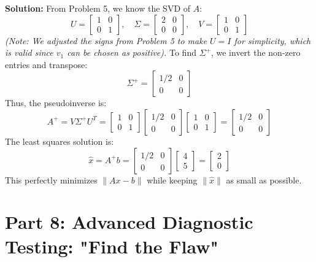 \documentclass[11pt, letterpaper]{article}
\theoremstyle{definition}
\theoremstyle{remark}
\begin{document}
\textbf{Solution:}
From Problem 5, we know the SVD of $A$:
\[
U = \begin{bmatrix} 1 & 0 \\ 0 & 1 \end{bmatrix}, \quad \Sigma = \begin{bmatrix} 2 & 0 \\ 0 & 0 \end{bmatrix}, \quad V = \begin{bmatrix} 1 & 0 \\ 0 & 1 \end{bmatrix}
\]
\textit{(Note: We adjusted the signs from Problem 5 to make $U=I$ for simplicity, which is valid since $v_1$ can be chosen as positive).}
To find $\Sigma^+$, we invert the non-zero entries and transpose:
\[
\Sigma^+ = \begin{bmatrix} 1/2 & 0 \\ 0 & 0 \end{bmatrix}
\]
Thus, the pseudoinverse is:
\[
A^+ = V \Sigma^+ U^T = \begin{bmatrix} 1 & 0 \\ 0 & 1 \end{bmatrix} \begin{bmatrix} 1/2 & 0 \\ 0 & 0 \end{bmatrix} \begin{bmatrix} 1 & 0 \\ 0 & 1 \end{bmatrix} = \begin{bmatrix} 1/2 & 0 \\ 0 & 0 \end{bmatrix}
\]
The least squares solution is:
\[
\hat{x} = A^+ b = \begin{bmatrix} 1/2 & 0 \\ 0 & 0 \end{bmatrix} \begin{bmatrix} 4 \\ 5 \end{bmatrix} = \begin{bmatrix} 2 \\ 0 \end{bmatrix}
\]
This perfectly minimizes $\|Ax - b\|$ while keeping $\|\hat{x}\|$ as small as possible.

\newpage
\section{Part 8: Advanced Diagnostic Testing: "Find the Flaw"}
\end{document}

